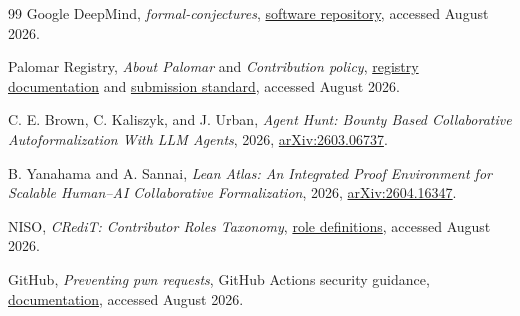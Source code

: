\documentclass[10pt]{article}
\begin{document}
\begin{thebibliography}{99}
Google DeepMind, \emph{formal-conjectures},
\href{https://github.com/google-deepmind/formal-conjectures}{software repository},
accessed August 2026.

Palomar Registry, \emph{About Palomar} and \emph{Contribution policy},
\href{https://palomar-registry.org/about}{registry documentation} and
\href{https://github.com/PalomarRegistry/PalomarPolicy/blob/main/CONTRIBUTING.md}{submission standard},
accessed August 2026.

C. E. Brown, C. Kaliszyk, and J. Urban, \emph{Agent Hunt: Bounty Based
Collaborative Autoformalization With LLM Agents}, 2026,
\href{https://arxiv.org/abs/2603.06737}{arXiv:2603.06737}.

B. Yanahama and A. Sannai, \emph{Lean Atlas: An Integrated Proof Environment
for Scalable Human--AI Collaborative Formalization}, 2026,
\href{https://arxiv.org/abs/2604.16347}{arXiv:2604.16347}.

NISO, \emph{CRediT: Contributor Roles Taxonomy},
\href{https://credit.niso.org/contributor-roles-defined/}{role definitions},
accessed August 2026.

GitHub, \emph{Preventing pwn requests}, GitHub Actions security guidance,
\href{https://docs.github.com/en/actions/reference/security/secure-use}{documentation},
accessed August 2026.

\end{thebibliography}
\end{document}
